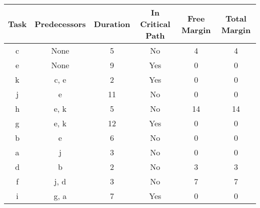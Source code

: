 \documentclass{article}
\begin{document}
\begin{center}
\begin{tabular}{|c| c| c| c| c| c|}
 \hline
 Task & Predecessors & Duration & In Critical Path & Free Margin & Total Margin\\ [0.5ex]\hline
c & None & 5 & No & 4 & 4 \\
\hline
e & None & 9 & Yes & 0 & 0 \\
\hline
k & c, e & 2 & Yes & 0 & 0 \\
\hline
j & e & 11 & No & 0 & 0 \\
\hline
h & e, k & 5 & No & 14 & 14 \\
\hline
g & e, k & 12 & Yes & 0 & 0 \\
\hline
b & e & 6 & No & 0 & 0 \\
\hline
a & j & 3 & No & 0 & 0 \\
\hline
d & b & 2 & No & 3 & 3 \\
\hline
f & j, d & 3 & No & 7 & 7 \\
\hline
i & g, a & 7 & Yes & 0 & 0 \\
\hline
\end{tabular}
\end{center}
\end{document}
